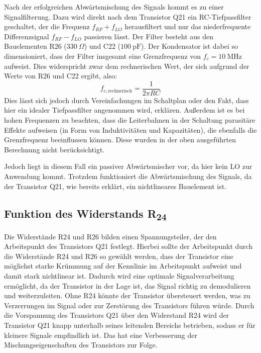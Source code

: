 Nach der erfolgreichen Abwärtsmischung des Signals kommt es zu einer Signalfilterung. Dazu wird direkt nach dem Transistor Q21 ein RC-Tiefpassfilter geschaltet, der die Frequenz $f_{RF} + f_{LO}$ herausfiltert und nur das niederfrequente Differenzsignal $f_{RF} - f_{LO}$ passieren lässt. Der Filter besteht aus den Bauelementen R26 ($330~\Omega$) und C22 ($100~\mathrm{pF}$). Der Kondensator ist dabei so dimensioniert, dass der Filter insgesamt eine Grenzfrequenz von $f_{c} = 10~\mathrm{MHz}$ aufweist. Dies widerspricht zwar dem rechnerischen Wert, der sich aufgrund der Werte von R26 und C22 ergibt, also:
\begin{equation}
    f_{c, \text{rechnerisch}} = \frac{1}{2\pi R C}
\end{equation}
Dies lässt sich jedoch durch Vereinfachungen im Schaltplan oder den Fakt, dass hier ein idealer Tiefpassfilter angenommen wird, erklären. Außerdem ist es bei hohen Frequenzen zu beachten, dass die Leiterbahnen in der Schaltung parasitäre Effekte aufweisen (in Form von Induktivitäten und Kapazitäten), die ebenfalls die Grenzfrequenz beeinflussen können. Diese wurden in der oben ausgeführten Berechnung nicht berücksichtigt.

Jedoch liegt in diesem Fall ein passiver Abwärtsmischer vor, da hier kein \ac{LO} zur Anwendung kommt. Trotzdem funktioniert die Abwärtsmischung des Signals, da der Transistor Q21, wie bereits erklärt, ein nichtlineares Bauelement ist.

\subsection{Funktion des Widerstands R\textsubscript{24}}
Die Widerstände R24 und R26 bilden einen Spannungsteiler, der den Arbeitspunkt des Transistors Q21 festlegt. Hierbei sollte der Arbeitspunkt durch die Widerstände R24 und R26 so gewählt werden, dass der Transistor eine möglichst starke Krümmung auf der Kennlinie im Arbeitspunkt aufweist und damit stark nichtlinear ist. Dadurch wird eine optimale Signalverarbeitung ermöglicht, da der Transistor in der Lage ist, das Signal richtig zu demodulieren und weiterzuleiten. Ohne R24 könnte der Transistor übersteuert werden, was zu Verzerrungen im Signal oder zur Zerstörung des Transistors führen würde.
Durch die Vorspannung des Transistors Q21 über den Widerstand R24 wird der Transistor Q21 knapp unterhalb seines leitenden Bereichs betrieben, sodass er für kleinere Signale empfindlich ist. Das hat eine Verbesserung der Mischungseigenschaften des Transistors zur Folge.

